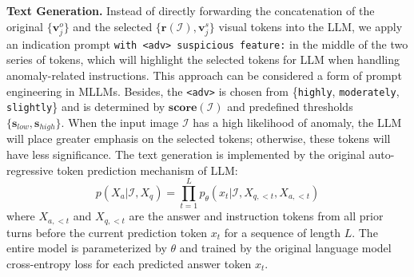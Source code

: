 \medskip
\noindent\textbf{Text Generation.} Instead of directly forwarding the concatenation of the original $\{\mathbf{v}^{o}_{j}\}$ and the selected $\{\mathbf{r}(\mathcal{I}), \mathbf{v}^{s}_{j}\}$ visual tokens into the LLM, we apply an indication prompt \texttt{with <adv> suspicious feature:} in the middle of the two series of tokens, which will highlight the selected tokens for LLM when handling anomaly-related instructions. This approach can be considered a form of prompt engineering in MLLMs. Besides, the \texttt{<adv>} is chosen from \{\texttt{highly}, \texttt{moderately}, \texttt{slightly}\} and is determined by $\mathbf{score}(\mathcal{I})$ and predefined thresholds $\{\textbf{s}_{low}, \textbf{s}_{high}\}$. When the input image $\mathcal{I}$ has a high likelihood of anomaly, the LLM will place greater emphasis on the selected tokens; otherwise, these tokens will have less significance. The text generation is implemented by the original auto-regressive token prediction mechanism of LLM:
\begin{equation}
    p(X_{a}|\mathcal{I}, X_{q})=\prod^{L}_{t=1}p_{\theta}(x_{t}|\mathcal{I}, X_{q, <t}, X_{a, <t})
\end{equation}
where $X_{a, <t}$ and $X_{q, <t}$ are the answer and instruction tokens from all prior turns before the current prediction token $x_{t}$ for a sequence of length $L$. The entire model is parameterized by $\theta$ and trained by the original language model cross-entropy loss for each predicted answer token $x_{t}$. 

